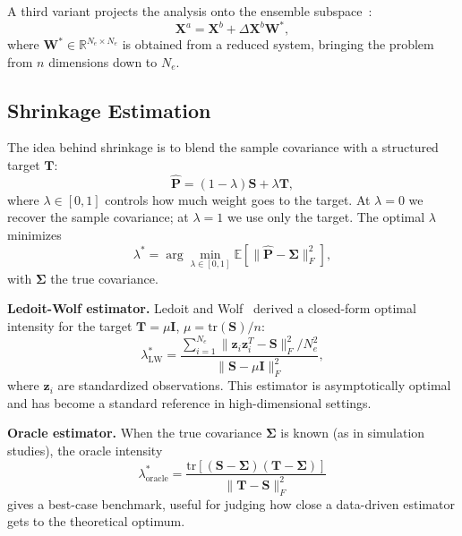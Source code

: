 A third variant projects the analysis onto the ensemble subspace~\cite{nino2022teda}:
\begin{equation}
\label{eq:ensemble_space}
\mathbf{X}^a = \mathbf{X}^b + \Delta\mathbf{X}^b \mathbf{W}^*,
\end{equation}
where $\mathbf{W}^* \in \mathbb{R}^{N_e \times N_e}$ is obtained from a reduced system, bringing the problem from $n$ dimensions down to $N_e$.

\subsection{Shrinkage Estimation}
\label{sec:shrinkage}

The idea behind shrinkage is to blend the sample covariance with a structured target $\mathbf{T}$:
\begin{equation}
\label{eq:shrinkage_cov}
\hat{\mathbf{P}} = (1 - \lambda) \mathbf{S} + \lambda \mathbf{T},
\end{equation}
where $\lambda \in [0,1]$ controls how much weight goes to the target. At $\lambda = 0$ we recover the sample covariance; at $\lambda = 1$ we use only the target. The optimal $\lambda$ minimizes
\begin{equation}
\label{eq:optimal_lambda}
\lambda^* = \arg\min_{\lambda \in [0,1]} \mathbb{E}\left[\|\hat{\mathbf{P}} - \boldsymbol{\Sigma}\|_F^2\right],
\end{equation}
with $\boldsymbol{\Sigma}$ the true covariance.

\textbf{Ledoit-Wolf estimator.} Ledoit and Wolf~\cite{ledoit2004well} derived a closed-form optimal intensity for the target $\mathbf{T} = \mu \mathbf{I}$, $\mu = \text{tr}(\mathbf{S})/n$:
\begin{equation}
\label{eq:lw_lambda}
\lambda^*_{\text{LW}} = \frac{\sum_{i=1}^{N_e} \|\mathbf{z}_i \mathbf{z}_i^T - \mathbf{S}\|_F^2 / N_e^2}{\|\mathbf{S} - \mu\mathbf{I}\|_F^2},
\end{equation}
where $\mathbf{z}_i$ are standardized observations. This estimator is asymptotically optimal and has become a standard reference in high-dimensional settings.

\textbf{Oracle estimator.} When the true covariance $\boldsymbol{\Sigma}$ is known (as in simulation studies), the oracle intensity
\begin{equation}
\label{eq:oracle}
\lambda^*_{\text{oracle}} = \frac{\text{tr}[(\mathbf{S} - \boldsymbol{\Sigma})(\mathbf{T} - \boldsymbol{\Sigma})]}{\|\mathbf{T} - \mathbf{S}\|_F^2}
\end{equation}
gives a best-case benchmark, useful for judging how close a data-driven estimator gets to the theoretical optimum.


